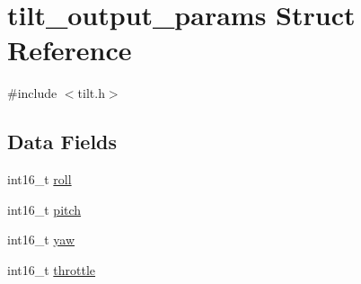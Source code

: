 \hypertarget{structtilt__output__params}{\section{tilt\+\_\+output\+\_\+params Struct Reference}
\label{structtilt__output__params}
}


{\ttfamily \#include $<$tilt.\+h$>$}

\subsection*{Data Fields}
\begin{DoxyCompactItemize}
\item 
int16\+\_\+t \hyperlink{structtilt__output__params_afd4b9309f77ee689bd3af744ca7093a2}{roll}
\item 
int16\+\_\+t \hyperlink{structtilt__output__params_a9f22346ddba202c0a750ada5ae08cfe9}{pitch}
\item 
int16\+\_\+t \hyperlink{structtilt__output__params_a820a14a0c5a807a82d0f810ac4a85232}{yaw}
\item 
int16\+\_\+t \hyperlink{structtilt__output__params_ae50193f0a1a8a7e45157948dcf8bedda}{throttle}
\end{DoxyCompactItemize}


